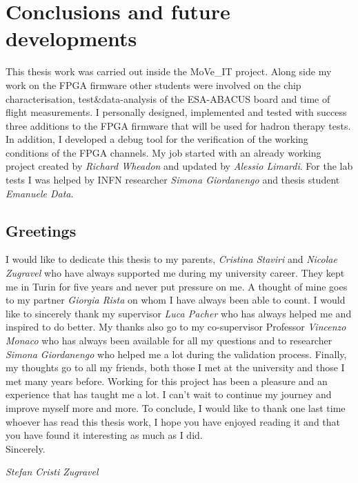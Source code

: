 \chapter*{Conclusions and future developments}
\pagestyle{plain}
\noindent This thesis work was carried out inside the MoVe\_IT project.
Along side my work on the FPGA firmware other students were involved on the chip characterisation, test\&data-analysis of the ESA-ABACUS board and time of flight measurements.
I personally designed, implemented and tested with success three additions to the FPGA firmware that will be used for hadron therapy tests.
In addition, I developed a debug tool for the verification of the working conditions of the FPGA channels.
My job started with an already working project created by \textit{Richard Wheadon} and updated by \textit{Alessio Limardi}.
For the lab tests I was helped by INFN researcher \textit{Simona Giordanengo} and thesis student \textit{Emanuele Data}.




\section*{Greetings}
I would like to dedicate this thesis to my parents, \textit{Cristina Staviri} and \textit{Nicolae Zugravel} who have always supported me during my university career.
They kept me in Turin for five years and never put pressure on me.
A thought of mine goes to my partner \textit{Giorgia Rista} on whom I have always been able to count.
I would like to sincerely thank my supervisor \textit{Luca Pacher} who has always helped me and inspired to do better.
My thanks also go to my co-supervisor Professor \textit{Vincenzo Monaco} who has always been available for all my questions and to researcher \textit{Simona Giordanengo} who helped me a lot during the validation process.
Finally, my thoughts go to all my friends, both those I met at the university and those I met many years before.
Working for this project has been a pleasure and an experience that has taught me a lot.
I can't wait to continue my journey and improve myself more and more.
To conclude, I would like to thank one last time whoever has read this thesis work, I hope you have enjoyed reading it and that you have found it interesting as much as I did.\\
\noindent Sincerely.
\vspace*{1cm}
\begin{flushright}
	\textit{Stefan Cristi Zugravel}
\end{flushright}